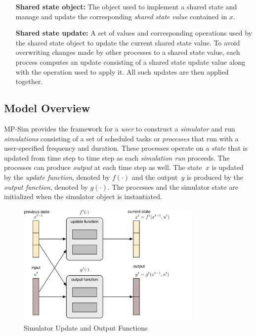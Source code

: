 \documentclass[12pt]{article}
\newcommand{\mpsim}[0]{{MP-Sim}}
\numberwithin{equation}{section}
\numberwithin{table}{section}
\numberwithin{figure}{section}
\begin{document}
\begin{itemize}
\item[\bf Shared state object:] The object used to implement a shared state and manage and update the corresponding \emph{shared state value} contained in $x$.
\item[\bf Shared state update:] A set of values and corresponding operations used by the shared state object to update the current shared state value. To avoid overwriting changes made by other processes to a shared state value, each process computes an update consisting of a shared state update value along with the operation used to apply it. All such updates are then applied together.
\end{itemize}




\subsection{Model Overview}
\label{sec:model}

\mpsim{} provides the framework for a \emph{user} to construct a \emph{simulator} and run \emph{simulations} consisting of a set of scheduled tasks or \emph{processes} that run with a user-specified frequency and duration. These processes operate on a \emph{state} that is updated from time step to time step as each \emph{simulation run} proceeds. The processes can produce \emph{output} at each time step as well. The state~$x$ is updated by the \emph{update function}, denoted by $f(\cdot)$ and the output~$y$ is produced by the \emph{output function}, denoted by $g(\cdot)$. The processes and the simulator state are initialized when the simulator object is instantiated.

\begin{figure}[hbtp]
  \centering
  \includegraphics[width=0.8\textwidth]{figures/simulator-update-diagram-1}
  \caption{Simulator Update and Output Functions}
  \label{fig:update1}
\end{figure}
\end{document}
